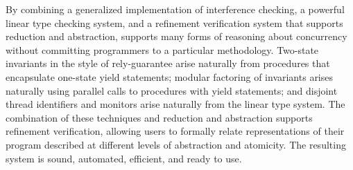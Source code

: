 By combining a generalized implementation of interference checking, a powerful linear type checking system, and a refinement verification system that supports reduction and abstraction, 
\civl supports many forms of reasoning about concurrency without committing programmers to a particular methodology.
Two-state invariants in the style of rely-guarantee arise naturally from procedures that encapsulate one-state yield statements;
modular factoring of invariants arises naturally using parallel calls to procedures with yield statements;
and disjoint thread identifiers and monitors arise naturally from the linear type system. The combination of these techniques and reduction and abstraction supports refinement verification, allowing users to formally relate representations of their program described at different levels of abstraction and atomicity. 
The resulting system is sound, automated, efficient, and ready to use.

